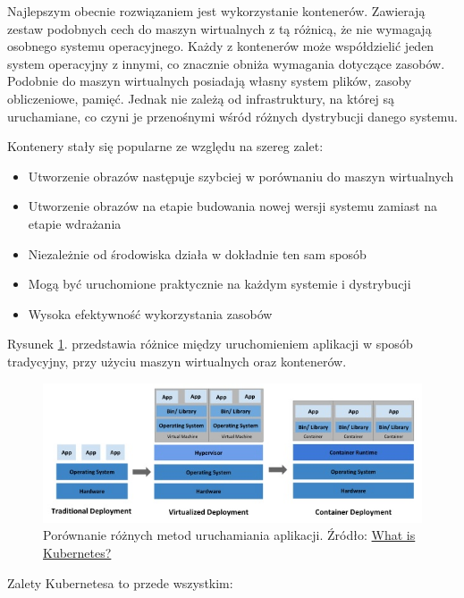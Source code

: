\documentclass[11pt, a4]{article} %
\begin{document}
Najlepszym obecnie rozwiązaniem jest wykorzystanie kontenerów. Zawierają zestaw 
podobnych cech do maszyn wirtualnych z tą różnicą, że nie wymagają osobnego systemu 
operacyjnego. Każdy z kontenerów może współdzielić jeden system operacyjny z 
innymi, co znacznie obniża wymagania dotyczące zasobów. Podobnie do maszyn 
wirtualnych posiadają własny system plików, zasoby obliczeniowe, pamięć. Jednak nie 
zależą od infrastruktury, na której są uruchamiane, co czyni je przenośnymi wśród 
różnych dystrybucji danego systemu.

Kontenery stały się popularne ze względu na szereg zalet:

\begin{itemize} %
    \item Utworzenie obrazów następuje szybciej w porównaniu do maszyn wirtualnych
    \item Utworzenie obrazów na etapie budowania nowej wersji systemu zamiast na etapie wdrażania
    \item Niezależnie od środowiska działa w dokładnie ten sam sposób
    \item Mogą być uruchomione praktycznie na każdym systemie i dystrybucji
    \item Wysoka efektywność wykorzystania zasobów
\end{itemize}

Rysunek \ref{fig:deployment-types}. przedstawia różnice między uruchomieniem aplikacji w sposób 
tradycyjny, przy użyciu maszyn wirtualnych oraz kontenerów.

\begin{figure}[h]
    \centering
    \includegraphics[width=1\textwidth]{deployment_types.jpg}
    \caption{Porównanie różnych metod uruchamiania aplikacji. Źródło: \href{https://kubernetes.io/docs/concepts/overview/what-is-kubernetes/}{What is Kubernetes?}}
    \label{fig:deployment-types}
\end{figure}

Zalety Kubernetesa to przede wszystkim:
\end{document}
